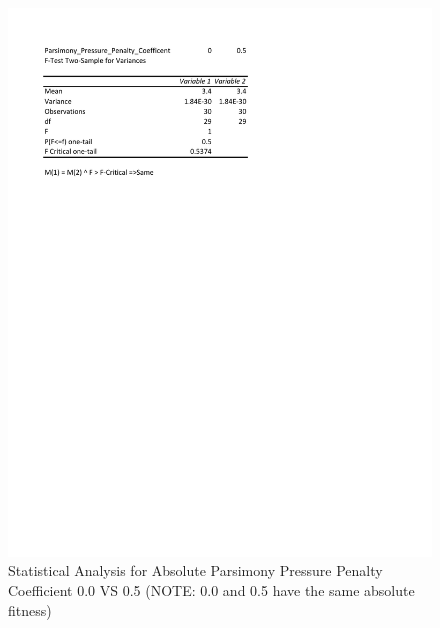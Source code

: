 \documentclass[times]{article}
\begin{document}
	\begin{figure}
		\caption{Statistical Analysis for Absolute Parsimony Pressure Penalty Coefficient 0.0 VS 0.5 (NOTE: 0.0 and 0.5 have the same absolute fitness)}
		\label{fig:stat_abs_01}
		\includegraphics[width=\textwidth]{./pictures/absolute_01.pdf}
	\end{figure}
\end{document}

